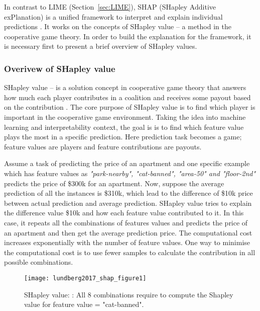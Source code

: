 \documentclass[english]{tktltiki2}
\theoremstyle{definition}
\theoremstyle{remark}
\begin{document}
In contrast to LIME (Section~\ref{sec:LIME}), SHAP (SHapley Additive exPlanation) is a unified framework to interpret and explain individual predictions \citep{lundberg2017unified}. It works on the concepts of SHapley value \citep{shapley1953value} -- a method in the cooperative game theory. In order to build the explanation for the framework, it is necessary first to present a brief overview of SHapley values. 

\subsubsection{Overivew of SHapley value} %
SHapley value -- is a solution concept in cooperative game theory that answers how much each player contributes in a coalition and receives some payout based on the contribution \citep{shapley1953value}. The core purpose of SHapley value is to find which player is important in the cooperative game environment. Taking the idea into machine learning and interpretability context, the goal is is to find which feature value plays the most in a specific prediction. Here prediction task becomes a game; feature values are players and feature contributions are payouts.

Assume a task of predicting the price of an apartment and one specific example which has feature values as \textit{"park-nearby", "cat-banned", "area-50" and "floor-2nd"} predicts the price of \$300k for an apartment. Now, suppose the average prediction of all the instances is \$310k, which lead to the difference of \$10k price between actual prediction and average prediction. SHapley value tries to explain the difference value \$10k  and how each feature value contributed to it. In this case, it repeats all the combinations of features values and predicts the price of an apartment and then get the average prediction price. The computational cost increases exponentially with the number of feature values. One way to minimise the computational cost is to use fewer samples to calculate the contribution in all possible combinations.

\begin{wrapfigure}{r}{0.5\textwidth}
	\centering
	\vspace*{-2mm}
	\texttt{[image: lundberg2017\_shap\_figure1]}
	\vspace*{-10mm}
	\caption{SHapley value: \citep{molnarinterpretable}: All 8 combinations require to compute the Shapley value for feature value = "cat-banned".}
	\label{fig:lundberg2017_shap_figure1}
\end{wrapfigure}
\end{document}
